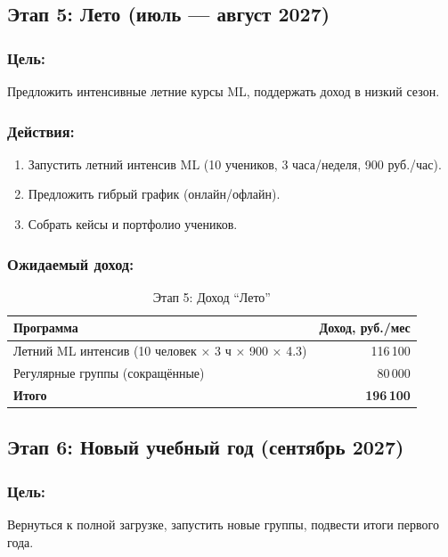 \documentclass[12pt,a4paper]{article}
\begin{document}
\subsection{Этап 5: Лето (июль --- август 2027)}

\subsubsection*{Цель:}
Предложить интенсивные летние курсы ML, поддержать доход в низкий сезон.

\subsubsection*{Действия:}
\begin{enumerate}
  \item Запустить летний интенсив ML (10 учеников, 3 часа/неделя, 900 руб./час).
  \item Предложить гибрый график (онлайн/офлайн).
  \item Собрать кейсы и портфолио учеников.
\end{enumerate}

\subsubsection*{Ожидаемый доход:}
\begin{table}[H]
\centering
\caption{Этап 5: Доход ``Лето''}
\begin{tabular}{lr}
\toprule
Программа & Доход, руб./мес \\
\midrule
Летний ML интенсив (10 человек × 3 ч × 900 × 4.3) & 116\,100 \\
Регулярные группы (сокращённые) & 80\,000 \\
\midrule
\textbf{Итого} & \textbf{196\,100} \\
\bottomrule
\end{tabular}
\end{table}

\subsection{Этап 6: Новый учебный год (сентябрь 2027)}

\subsubsection*{Цель:}
Вернуться к полной загрузке, запустить новые группы, подвести итоги первого года.
\end{document}
